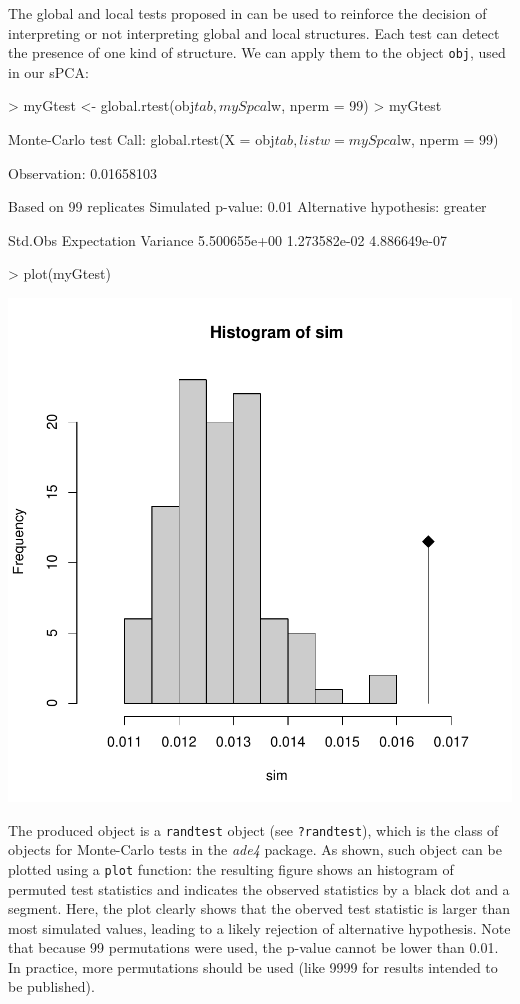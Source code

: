 \documentclass{article}
\begin{document}
The global and local tests proposed in \cite{tjart04} can
be used to reinforce the decision of interpreting or not
interpreting global and local structures.
Each test can detect the presence of one kind of structure.
We can apply them to the object \texttt{obj}, used in our sPCA:
\begin{Schunk}
\begin{Sinput}
> myGtest <- global.rtest(obj$tab, mySpca$lw, nperm = 99)
> myGtest
\end{Sinput}
\begin{Soutput}
Monte-Carlo test
Call: global.rtest(X = obj$tab, listw = mySpca$lw, nperm = 99)

Observation: 0.01658103 

Based on 99 replicates
Simulated p-value: 0.01 
Alternative hypothesis: greater 

     Std.Obs  Expectation     Variance 
5.500655e+00 1.273582e-02 4.886649e-07 
\end{Soutput}
\begin{Sinput}
> plot(myGtest)
\end{Sinput}
\end{Schunk}
\includegraphics{figs/spca-globalrtest}

\noindent The produced object is a \texttt{randtest} object (see
\texttt{?randtest}), which is the class of objects for Monte-Carlo
tests in the \textit{ade4} package.
As shown, such object can be plotted using a \texttt{plot} function:
the resulting figure shows an histogram of permuted test statistics
and indicates the observed statistics by a black dot and a segment.
Here, the plot clearly shows that the oberved test statistic is larger
than most simulated values, leading to a likely rejection of
alternative hypothesis.
Note that because 99 permutations were used, the p-value cannot be
lower than 0.01.
In practice, more permutations should be used (like 9999 for results
intended to be published).
\end{document}
